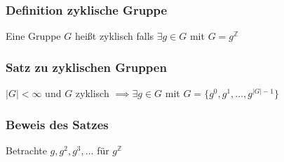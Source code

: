 \documentclass[12pt, german]{article}
\begin{document}
\subsubsection{Definition zyklische Gruppe}
	Eine Gruppe $G$ heißt zyklisch falls $\exists g \in G$ mit $G=g^{\mathbb Z}$

\subsubsection{Satz zu zyklischen Gruppen}
	$|G| < \infty$ und $G$ zyklisch $\implies \exists g \in G$ mit $G =\{g^0, g^1, \ldots, g^{|G| -1} \}$  

\subsubsection{Beweis des Satzes}
 Betrachte $g, g^2, g^3, \ldots$ für $g^{\mathbb Z}$

	
\end{document}
